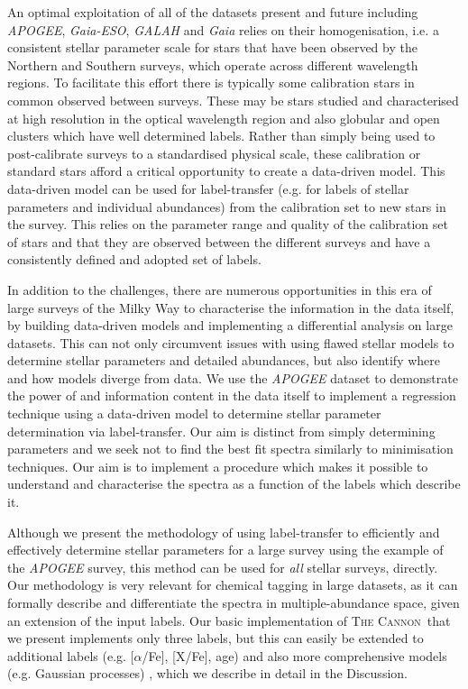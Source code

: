 \documentclass[12pt, preprint]{aastex}
\newcommand{\tc}{\textsc{The Cannon}}
\begin{document}
An optimal exploitation of all of the datasets present and future including \textit{APOGEE}, \textit{Gaia-ESO}, \textit{GALAH} and \textit{Gaia} relies on their homogenisation, i.e. a consistent stellar parameter scale for stars that have been observed by the Northern and Southern surveys, which operate across different wavelength regions. To facilitate this effort there is typically some calibration stars in common observed between surveys. These may be stars studied and characterised at high resolution in the optical wavelength region and also globular and open clusters which have well determined labels. Rather than simply being used to post-calibrate surveys to a standardised physical scale, these calibration or standard stars afford a critical opportunity to create a data-driven model.  This data-driven model can be used for label-transfer (e.g. for labels of stellar parameters and individual abundances) from the calibration set to new stars in the survey. This relies on the parameter range and quality of the calibration set of stars and that they are observed between the different surveys and have a consistently defined and adopted set of labels. 

In addition to the challenges, there are numerous opportunities in this era of large surveys of the Milky Way to characterise the information in the data itself, by building data-driven models and implementing a differential analysis on large datasets. This can not only circumvent issues with using flawed stellar models to determine stellar parameters and detailed abundances, but also identify where and how models diverge from data. We use the \textit{APOGEE} dataset to demonstrate the power of and information content in the data itself to implement a regression technique using a data-driven model to determine stellar parameter determination via label-transfer. Our aim is distinct from simply determining parameters and we seek not to find the best fit spectra similarly to minimisation techniques. Our aim is to implement a procedure which makes it possible to understand and characterise the spectra as a function of the labels which describe it. %

Although we present the methodology of using label-transfer to efficiently and effectively determine stellar parameters for a large survey using the example of the \textit{APOGEE} survey, this method can be used for \textit{all} stellar surveys, directly.  Our methodology is very relevant for chemical tagging in large datasets, as it can formally describe and differentiate the spectra in multiple-abundance space, given an extension of the input labels.  Our basic implementation of \tc\ that we present implements only three labels, but this can easily be extended to additional labels  (e.g. [$\alpha$/Fe], [X/Fe], age) and also more comprehensive models (e.g. Gaussian processes) , which we describe in detail in the Discussion. 
\end{document}
